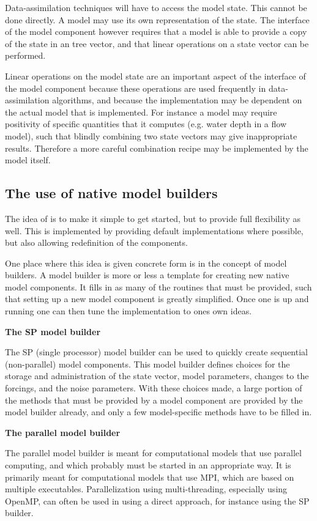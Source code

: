 Data-assimilation techniques will have to access the model state. This cannot be done directly. A model may use its own representation of the state. The interface of the \oda model component however requires that a model is able to provide a copy of the state in an \oda tree vector, and that linear operations on a state vector can be performed.

Linear operations on the model state are an important aspect of the interface of the model component because these operations are used frequently in data-assimilation algorithms, and because the implementation may be dependent on the actual model that is implemented. For instance a model may require positivity of specific quantities that it computes (e.g. water depth in a flow model), such that blindly combining two state vectors may give inappropriate results. Therefore a more careful combination recipe may be implemented by the model itself. 

\subsection{The use of native model builders}

The idea of \oda is to make it simple to get started, but to provide full flexibility as well. This is implemented by providing default implementations where possible, but also allowing redefinition of the \oda components.

One place where this idea is given concrete form is in the concept of model builders. A model builder is more or less a template for creating new native model components. It fills in as many of the routines that must be provided, such that setting up a new model component is greatly simplified. Once one is up and running one can then tune the implementation to ones own ideas.

\textbf{The SP model builder}

The SP (single processor) model builder can be used to quickly create sequential (non-parallel) model components. This model builder defines choices for the storage and administration of the state vector, model parameters, changes to the forcings, and the noise parameters. With these choices made, a large portion of the methods that must be provided by a model component are provided by the model builder already, and only a few model-specific methods have to be filled in.

\textbf{The parallel model builder}

The parallel model builder is meant for computational models that use parallel computing, and which probably must be started in an appropriate way. It is primarily meant for computational models that use MPI, which are based on multiple executables. Parallelization using multi-threading, especially using OpenMP, can often be used in \oda using a direct approach, for instance using the SP builder.

